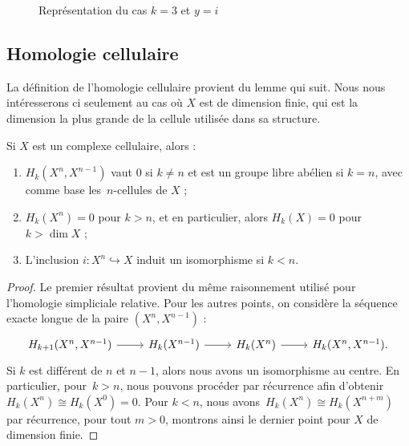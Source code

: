 \begin{figure}[H]
\centering
{}
\caption{Représentation du cas $k=3$ et $y=i$}
\label{fig:deg-loc-circle}
\end{figure}

\subsection{Homologie cellulaire}

La définition de l'homologie cellulaire provient du lemme qui suit. Nous nous intéresserons ci seulement au cas où $X$ est de dimension finie, qui est la dimension la plus grande de la cellule utilisée dans sa structure.

\begin{lemma}\label{lemma:cell-homology}
Si $X$ est un complexe cellulaire, alors : \begin{enumerate}[label=(\alph*)]
    \item $H_k(X^n,X^{n-1})$ vaut 0 si $k\neq n$ et est un groupe libre abélien si $k=n$, avec comme base les~$n$-cellules de $X$ ;
    \item $H_k(X^n)=0$ pour $k>n$, et en particulier, alors $H_k(X)=0$ pour~$k>\dim X$ ;
    \item L'inclusion $i:X^n\hookrightarrow X$ induit un isomorphisme si $k<n$.
\end{enumerate}
\end{lemma}
\begin{proof}
Le premier résultat provient du même raisonnement utilisé pour l'homologie simpliciale relative. Pour les autres points, on considère la séquence exacte longue de la paire $(X^n,X^{n-1})$ : \[\begin{tikzcd}
H_{k+1}(X^n,X^{n-1})\arrow[r]&H_k(X^{n-1})\arrow[r]&H_k(X^n)\arrow[r]&H_k(X^n,X^{n-1}).
\end{tikzcd}\]Si $k$ est différent de $n$ et $n-1$, alors nous avons un isomorphisme au centre. En particulier, pour~$k>n$, nous pouvons procéder par récurrence afin d'obtenir $H_k(X^n)\cong H_k(X^0)=0$. Pour $k<n$, nous avons~$H_k(X^n)\cong H_k(X^{n+m})$ par récurrence, pour tout $m>0$, montrons ainsi le dernier point pour $X$ de dimension finie.
\end{proof}

